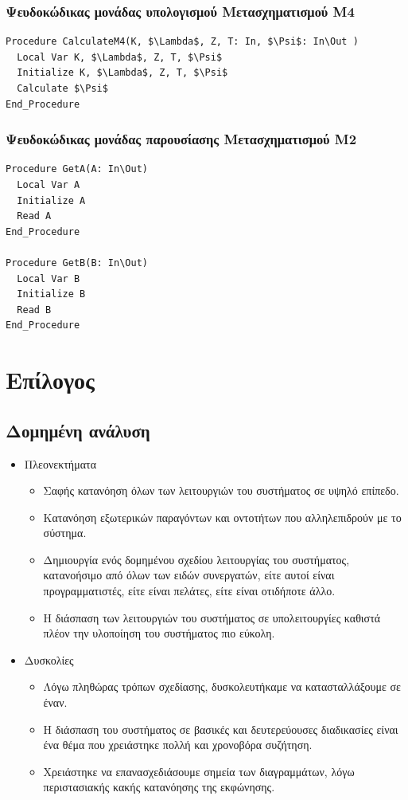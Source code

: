 \documentclass{article}
\begin{document}
\subsubsection{Ψευδοκώδικας μονάδας υπολογισμού Μετασχηματισμού Μ4}
\begin{lstlisting}[mathescape]
Procedure CalculateM4(K, $\Lambda$, Z, T: In, $\Psi$: In\Out )
  Local Var K, $\Lambda$, Z, T, $\Psi$
  Initialize K, $\Lambda$, Z, T, $\Psi$
  Calculate $\Psi$
End_Procedure
\end{lstlisting}

\subsubsection{Ψευδοκώδικας μονάδας παρουσίασης Μετασχηματισμού Μ2}
\begin{lstlisting}[mathescape]
Procedure GetA(A: In\Out)
  Local Var A
  Initialize A
  Read A
End_Procedure

Procedure GetB(B: In\Out)
  Local Var B
  Initialize B
  Read B
End_Procedure
\end{lstlisting}

\newpage
\section{Επίλογος}
\subsection{Δομημένη ανάλυση}
\begin{itemize}
	\item Πλεονεκτήματα
		\begin{itemize}
			\item Σαφής κατανόηση όλων των λειτουργιών του συστήματος σε υψηλό επίπεδο.
			\item Κατανόηση εξωτερικών παραγόντων και οντοτήτων που αλληλεπιδρούν με το σύστημα.
			\item Δημιουργία ενός δομημένου σχεδίου λειτουργίας του συστήματος, κατανοήσιμο από όλων των ειδών συνεργατών,
					είτε αυτοί είναι προγραμματιστές, είτε είναι πελάτες, είτε είναι οτιδήποτε άλλο.
			\item Η διάσπαση των λειτουργιών του συστήματος σε υπολειτουργίες καθιστά πλέον την υλοποίηση του συστήματος πιο εύκολη.
		\end{itemize}
	\item Δυσκολίες
		\begin{itemize}
			\item Λόγω πληθώρας τρόπων σχεδίασης, δυσκολευτήκαμε να κατασταλλάξουμε σε έναν.
			\item Η διάσπαση του συστήματος σε βασικές και δευτερεύουσες διαδικασίες είναι ένα θέμα που χρειάστηκε πολλή και χρονοβόρα συζήτηση.
			\item Χρειάστηκε να επανασχεδιάσουμε σημεία των διαγραμμάτων, λόγω περιστασιακής κακής κατανόησης της εκφώνησης.
	 	\end{itemize}
\end{itemize}
\end{document}
